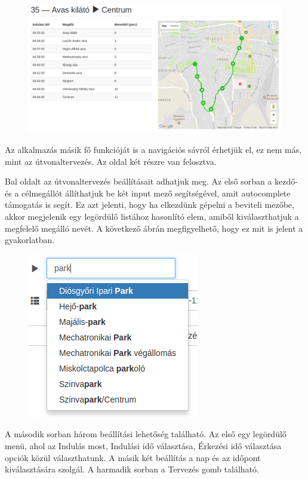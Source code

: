 \begin{figure}[h!]
\centering
\includegraphics[scale=0.35]{kepek/trip_tablazat_es_terkep.png}
\caption{}
\label{fig:trip_tablazat_es_terkep}
\end{figure}

Az alkalmazás másik fő funkcióját is a navigációs sávról érhetjük el, ez nem más, mint az útvonaltervezés. Az oldal két részre van felosztva.

Bal oldalt az útvonaltervezés beállításait adhatjuk meg. Az első sorban a kezdő- és a célmegállót állíthatjuk be két input mező segítségével, amit autocomplete támogatás is segít. Ez azt jelenti, hogy ha elkezdünk gépelni a beviteli mezőbe, akkor megjelenik egy legördülő listához hasonlító elem, amiből kiválaszthatjuk a megfelelő megálló nevét. A következő ábrán megfigyelhető, hogy ez mit is jelent a gyakorlatban.

\begin{figure}[h!]
\centering
\includegraphics[scale=0.6]{kepek/autocomplete.png}
\caption{}
\label{fig:autocomplete}
\end{figure}

A második sorban három beállítási lehetőség található. Az első egy legördülő menü, ahol az Indulás most, Indulási idő választása, Érkezési idő választása opciók közül választhatunk. A másik két beállítás a nap és az időpont kiválasztására szolgál. A harmadik sorban a Tervezés gomb található.

